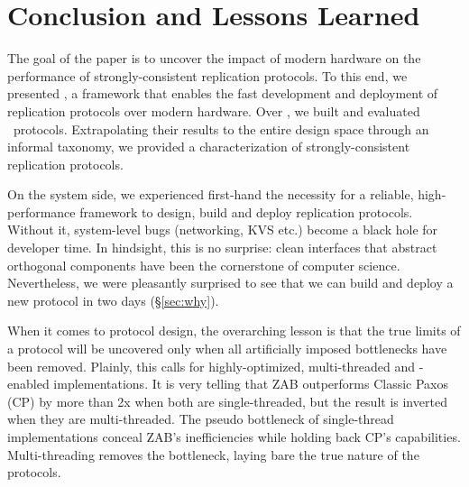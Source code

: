\section{Conclusion and Lessons Learned}
\label{sec:conclusion}

The goal of the paper is to uncover the impact of modern hardware on the performance of strongly-consistent replication protocols.
To this end, we presented \odlib, a framework that enables the fast development and deployment of replication protocols over modern hardware. 
Over \odlib, we built and evaluated \pnum\ protocols. 
Extrapolating their results to the entire design space through an informal taxonomy, we provided a characterization of strongly-consistent replication protocols.

On the system side, we experienced first-hand the necessity for a reliable, high-performance framework to design, build and deploy replication protocols. Without it, system-level bugs (networking, KVS etc.) become a black hole for developer time.
In hindsight, this is no surprise: clean interfaces that abstract orthogonal components have been the cornerstone of computer science. %
Nevertheless, 
we were pleasantly surprised to see that we can build and deploy a new protocol in two days (\S\ref{sec:why}). 

When it comes to protocol design, the overarching lesson is that the true limits of a protocol will be uncovered only when all artificially imposed bottlenecks have been removed. 
Plainly, this calls for highly-optimized, multi-threaded and \RDMA-enabled implementations. 
It is very telling that ZAB outperforms Classic Paxos (CP) by more than 2x when both are single-threaded, but the result is inverted when they are multi-threaded. 
The pseudo bottleneck of single-thread implementations conceal ZAB's inefficiencies while holding back CP's capabilities. Multi-threading removes the bottleneck, laying bare the true nature of the protocols.



